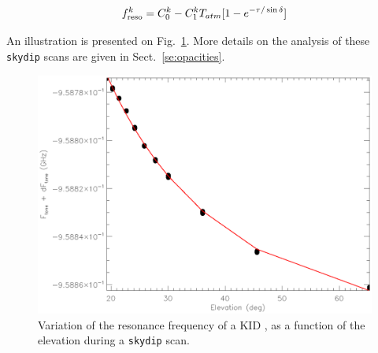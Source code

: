 \begin{equation}
  f_{\rm{reso}}^k  = C_0^k - C_1^k T_{atm}[1-e^{-\tau/\sin\delta}]
\label{eq:skydip_1}
\end{equation}

An illustration is presented on Fig.~\ref{fig:ftone_vs_elev}. More details on
the analysis of these {\tt skydip} scans are given in Sect.~\ref{se:opacities}.

\begin{figure}[ht!]
\begin{center}
  \includegraphics[clip, angle=0, scale=0.75]{Figures/skydip_report.eps}
\caption[skydip]{Variation of the resonance frequency of a KID
  ,  as a function of the
  elevation during a {\tt skydip} scan. }
\label{fig:ftone_vs_elev}
\end{center}
\end{figure}

\subsection{\bms}
\label{se:beammaps}

